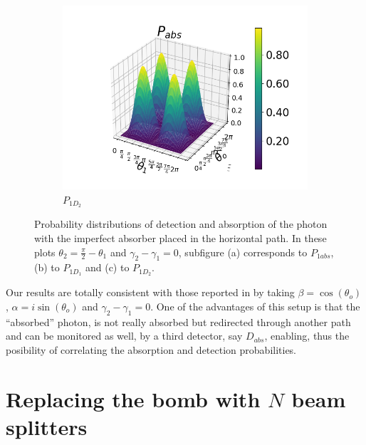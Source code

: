 \documentclass[12pt]{book}
\begin{document}
\begin{figure}[t]
\begin{subfigure}[b]{0.45\linewidth}
\includegraphics[width=\linewidth]{images/PAbs_BS_v.png}
\caption{$P_{1D_{2}}$}
\label{fig:BS1}
\end{subfigure}
\caption{Probability distributions of detection and absorption of the photon with the imperfect absorber placed in the horizontal path. In these plots $\theta_{2}=\frac{\pi}{2}-\theta_{1}$ and $\gamma_{2}-\gamma_{1}=0$, subfigure (a) corresponds to $P_{1abs}$, (b) to $P_{1D_{1}}$ and (c) to $P_{1D_{2}}$.}
\label{P_bs2}
\end{figure}



Our results are totally consistent with those reported in \cite{zuri,azuri} by taking $\beta=\cos(\theta_{o})$, $\alpha=i \sin(\theta_{o})$ and $\gamma_{2}-\gamma_{1}=0$. One of the advantages of this setup is that the ``absorbed'' photon, is not really absorbed but redirected through another path and can be monitored as well, by a third detector, say $D_{abs}$, enabling, thus the posibility of correlating the absorption and detection probabilities.

\section{Replacing the bomb with $N$ beam splitters }
\end{document}
